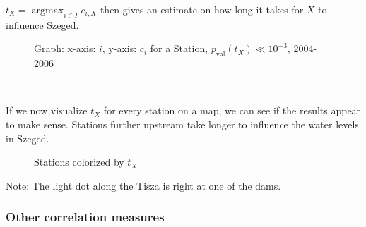 \documentclass{article}
\newcommand{\tmop}[1]{\ensuremath{\operatorname{#1}}}
\begin{document}
$t_X = \tmop{argmax}_{i \in I} c_{i, X}$ then gives an estimate on how long it
takes for $X$ to influence Szeged.

\begin{figure}[h]
  \caption{Graph: x-axis: $i$, y-axis: $c_i$ for a Station, $p_{\tmop{val}}
  (t_X) \ll 10^{- 3}$, 2004-2006}
\end{figure}

\

If we now visualize $t_X$ for every station on a map, we can see if the
results appear to make sense. Stations further upstream take longer to
influence the water levels in Szeged.

\begin{figure}[h]
  \caption{Stations colorized by $t_X$}
\end{figure}

Note: The light dot along the Tisza is right at one of the dams.

\subsubsection{Other correlation measures}
\end{document}
